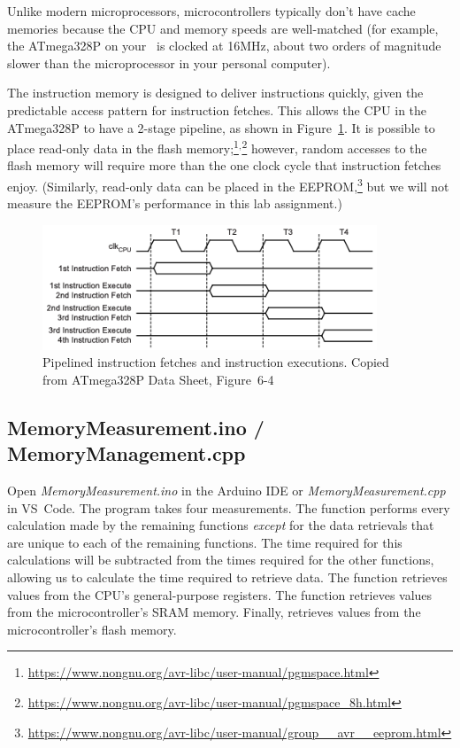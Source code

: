 Unlike modern microprocessors, microcontrollers typically don't have cache
memories because the CPU and memory speeds are well-matched (for example,
the ATmega328P on your \nano\ is clocked at 16MHz, about two orders of
magnitude slower than the microprocessor in your personal computer).

The instruction memory is designed to deliver instructions quickly, given the
predictable access pattern for instruction fetches. This allows the CPU in the
ATmega328P to have a 2-stage pipeline, as shown in Figure~\ref{fig:pipelining}.
It is possible to place read-only data in the flash
memory;\footnote{\url{https://www.nongnu.org/avr-libc/user-manual/pgmspace.html}}$^,$\footnote{\url{https://www.nongnu.org/avr-libc/user-manual/pgmspace_8h.html}}
however, random accesses to the flash memory will require more than the one
clock cycle that instruction fetches enjoy. (Similarly, read-only data can be
placed in the EEPROM,\footnote{\url{https://www.nongnu.org/avr-libc/user-manual/group__avr__eeprom.html}}
but we will not measure the EEPROM's performance in this lab assignment.)

\begin{figure}
    \centering
    \includegraphics[width=10cm]{ATmega328P_PipelineTiming}
    \caption{Pipelined instruction fetches and instruction executions. \tiny Copied from ATmega328P Data Sheet, Figure~6-4 \label{fig:pipelining}}
\end{figure}

\subsection{MemoryMeasurement.ino / MemoryManagement.cpp}

Open \textit{MemoryMeasurement.ino} in the Arduino IDE or \textit{MemoryMeasurement.cpp} in VS~Code. The program takes four
measurements. The  function performs every
calculation made by the remaining functions \textit{except} for the data
retrievals that are unique to each of the remaining functions. The time
required for this calculations will be subtracted from the times required for
the other functions, allowing us to calculate the time required to retrieve
data. The  function retrieves values from the
CPU's general-purpose registers. The  function
retrieves values from the microcontroller's SRAM memory. Finally,
 retrieves values from the microcontroller's
flash memory.

